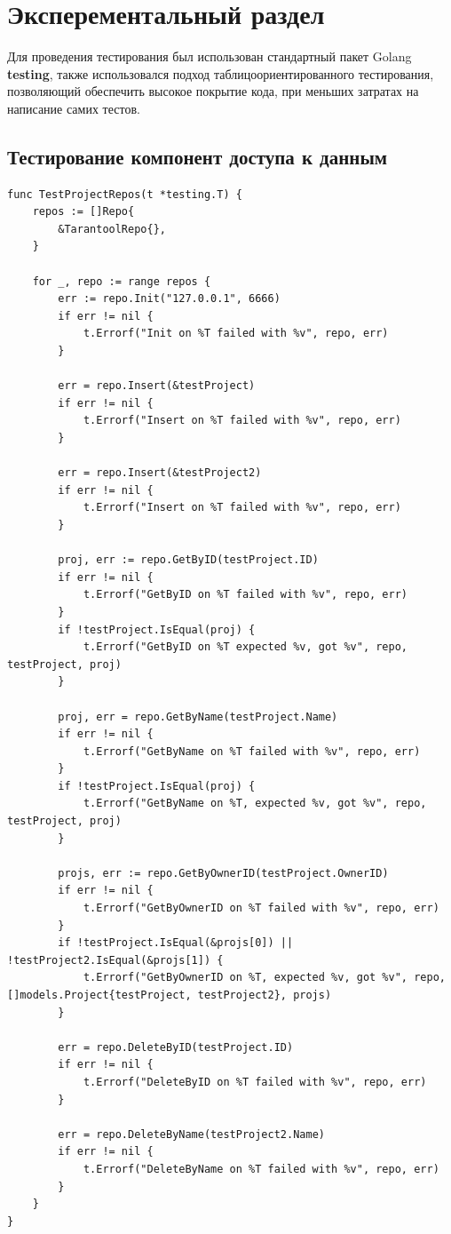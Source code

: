 \section{Эксперементальный раздел}

Для проведения тестирования был использован стандартный пакет Golang \textbf{testing}, также использовался подход
таблицоориентированного
тестирования, позволяющий обеспечить высокое покрытие кода, при меньших затратах на написание самих тестов.\cite{testdriven} 
\subsection{Тестирование компонент доступа к данным}

\begin{lstlisting}[caption=Тестирование компонент доступа к данным]
func TestProjectRepos(t *testing.T) {
    repos := []Repo{
        &TarantoolRepo{},
    }

    for _, repo := range repos {
        err := repo.Init("127.0.0.1", 6666)
        if err != nil {
            t.Errorf("Init on %T failed with %v", repo, err)
        }

        err = repo.Insert(&testProject)
        if err != nil {
            t.Errorf("Insert on %T failed with %v", repo, err)
        }

        err = repo.Insert(&testProject2)
        if err != nil {
            t.Errorf("Insert on %T failed with %v", repo, err)
        }

        proj, err := repo.GetByID(testProject.ID)
        if err != nil {
            t.Errorf("GetByID on %T failed with %v", repo, err)
        }
        if !testProject.IsEqual(proj) {
            t.Errorf("GetByID on %T expected %v, got %v", repo, testProject, proj)
        }

        proj, err = repo.GetByName(testProject.Name)
        if err != nil {
            t.Errorf("GetByName on %T failed with %v", repo, err)
        }
        if !testProject.IsEqual(proj) {
            t.Errorf("GetByName on %T, expected %v, got %v", repo, testProject, proj)
        }

        projs, err := repo.GetByOwnerID(testProject.OwnerID)
        if err != nil {
            t.Errorf("GetByOwnerID on %T failed with %v", repo, err)
        }
        if !testProject.IsEqual(&projs[0]) || !testProject2.IsEqual(&projs[1]) {
            t.Errorf("GetByOwnerID on %T, expected %v, got %v", repo, []models.Project{testProject, testProject2}, projs)
        }

        err = repo.DeleteByID(testProject.ID)
        if err != nil {
            t.Errorf("DeleteByID on %T failed with %v", repo, err)
        }

        err = repo.DeleteByName(testProject2.Name)
        if err != nil {
            t.Errorf("DeleteByName on %T failed with %v", repo, err)
        }
    }
}
\end{lstlisting}

